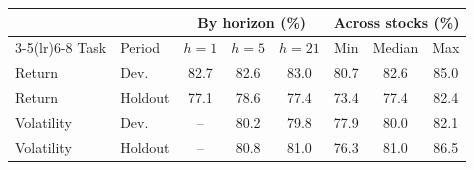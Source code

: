 \begin{tabular}{llcccccc}
\toprule
 & & \multicolumn{3}{c}{By horizon (\%)} & \multicolumn{3}{c}{Across stocks (\%)} \\
\cmidrule(lr){3-5}\cmidrule(lr){6-8}
Task & Period & $h{=}1$ & $h{=}5$ & $h{=}21$ & Min & Median & Max \\
\midrule
Return & Dev. & 82.7 & 82.6 & 83.0 & 80.7 & 82.6 & 85.0 \\
Return & Holdout & 77.1 & 78.6 & 77.4 & 73.4 & 77.4 & 82.4 \\
Volatility & Dev. & -- & 80.2 & 79.8 & 77.9 & 80.0 & 82.1 \\
Volatility & Holdout & -- & 80.8 & 81.0 & 76.3 & 81.0 & 86.5 \\
\bottomrule
\end{tabular}
